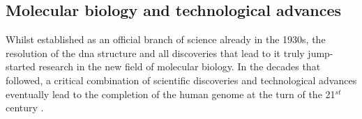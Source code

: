 


\newpage

\subsection{Molecular biology and technological advances}

Whilst established as an official branch of science already in the 1930s, the resolution of the \gls{dna} structure and all discoveries that lead to it truly jump-started research in the new field of molecular biology.
In the decades that followed, a critical combination of scientific discoveries and technological advances eventually lead to the completion of the human genome at the turn of the 21$^{st}$ century \cite{nhgri2003genetic}.


